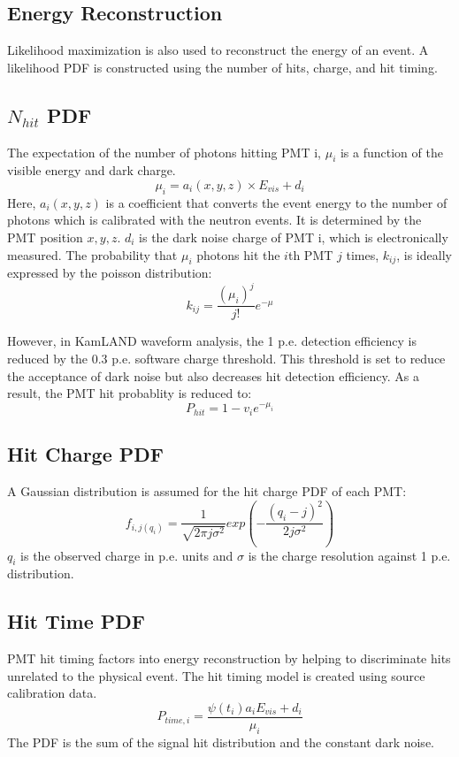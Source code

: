 \subsection{Energy Reconstruction}
Likelihood maximization is also used to reconstruct the energy of an event. A likelihood PDF is constructed using the number of hits, charge, and hit timing.
\subsection*{$N_{hit}$ PDF}
The expectation of the number of photons hitting PMT i, $\mu_i$ is a function of the visible energy and dark charge.
\begin{equation}
	\mu_i = a_i(x,y,z)\times E_{vis} +d_i
\end{equation}
Here, $a_i(x,y,z)$ is a coefficient that converts the event energy to the number of photons which is calibrated with the neutron events. It is determined by the PMT position $x,y,z$. $d_i$ is the dark noise charge of PMT i, which is electronically measured. The probability that $\mu_i$ photons hit the $i$th PMT $j$ times, $k_{ij}$, is ideally expressed by the poisson distribution:
\begin{equation}
	k_{ij}=\frac{(\mu_i)^j}{j!}e^{-\mu}
\end{equation}

However, in KamLAND waveform analysis, the 1 p.e. detection efficiency is reduced by the 0.3 p.e. software charge threshold. This threshold is set to reduce the acceptance of dark noise but also decreases hit detection efficiency. As a result, the PMT hit probablity is reduced to:
\begin{equation}
	P_{hit}=1-v_ie^{-\mu_i}
\end{equation}

\subsection*{Hit Charge PDF}
A Gaussian distribution is assumed for the hit charge PDF of each PMT:
\begin{equation}
	f_{i,j(q_i)}=\frac{1}{\sqrt{2\pi j\sigma^2}}exp(-\frac{(q_i-j)^2}{2j\sigma^2})
\end{equation}
$q_i$ is the observed charge in p.e. units and $\sigma$ is  the charge resolution against 1 p.e. distribution.

\subsection*{Hit Time PDF}
PMT hit timing factors into energy reconstruction by helping to discriminate hits unrelated to the physical event. The hit timing model is created using source calibration data. 
\begin{equation}
	P_{time,i} = \frac{\psi(t_i)a_i E_{vis}+d_i}{\mu_i}
\end{equation}
The PDF is the sum of the signal hit distribution and the constant dark noise.
